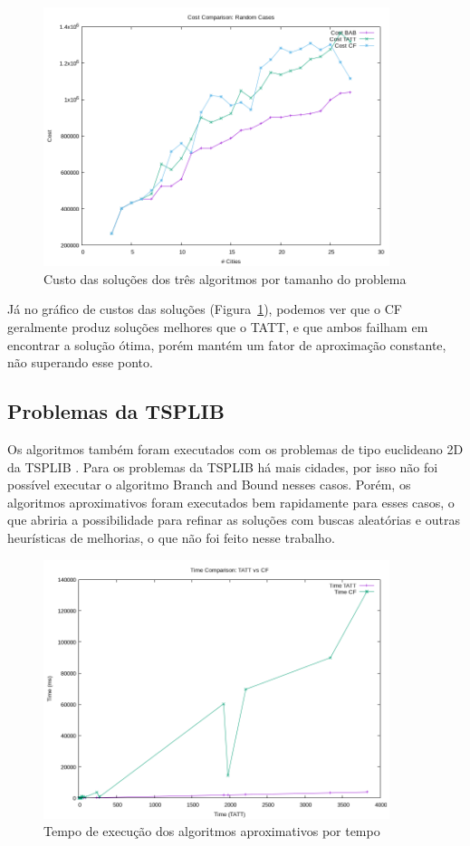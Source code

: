 \documentclass[12pt]{article}
\begin{document}
\begin{figure}
\centering
\includegraphics[width=0.9\textwidth]{random_plot_costs.png}
\caption{Custo das soluções dos três algoritmos por tamanho do problema}
\label{fig:randomCosts}
\end{figure}

Já no gráfico de custos das soluções (Figura~\ref{fig:randomCosts}), podemos
ver que o CF geralmente produz soluções melhores que o TATT, e que ambos
failham em encontrar a solução ótima, porém mantém um fator de aproximação
constante, não superando esse ponto.

\pagebreak

\subsection{Problemas da TSPLIB}
Os algoritmos também foram executados com os problemas de tipo euclideano 2D da TSPLIB
\cite{johnson1997traveling}.
Para os problemas da TSPLIB há mais cidades, por isso não foi possível executar
o algoritmo Branch and Bound nesses casos. Porém, os algoritmos aproximativos
foram executados bem rapidamente para esses casos, o que abriria a possibilidade
para refinar as soluções com buscas aleatórias e outras heurísticas de melhorias,
o que não foi feito nesse trabalho.

\begin{figure}
\centering
\includegraphics[width=0.9\textwidth]{tsplib_plot_times.png}
\caption{Tempo de execução dos algoritmos aproximativos por tempo}
\label{fig:tsplibTimes}
\end{figure}
\end{document}
